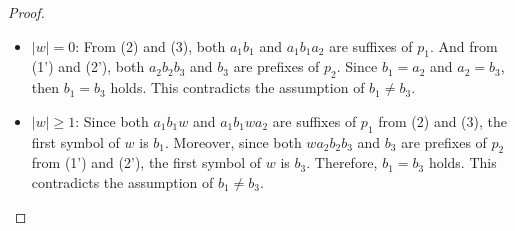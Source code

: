 \begin{proof}
\begin{itemize}
\item $|w|=0$: From (2) and (3), {\color{red}both }$a_{1}b_{1}$ and $a_{1}b_{1}a_{2}$ are suffixes of $p_{1}$. And from (1') and (2'), {\color{red}both }$a_{2}b_{2}b_{3}$ and $b_{3}$ are prefixes of $p_{2}$.
Since $b_{1}=a_{2}$ and $a_{2}=b_{3}$, then $b_{1}=b_{3}$ holds.
This contradicts the assumption of $b_{1}\not= b_{3}$.
%
\item $|w| \ge 1$: Since {\color{red}both }$a_{1}b_{1}w$ and $a_{1}b_{1}wa_{2}$ are suffixes of $p_{1}$ from (2) and (3), the first symbol of $w$ is $b_{1}$.
Moreover, since {\color{red}both }$wa_{2}b_{2}b_{3}$ and $b_{3}$ are prefixes of $p_{2}$ from (1') and (2'),
the first symbol of $w$ is $b_{3}$.
Therefore, $b_{1}=b_{3}$ holds.
This contradicts the assumption of $b_{1} \ne b_{3}$.
\end{itemize}
\vspace*{-1em}
\end{proof}
